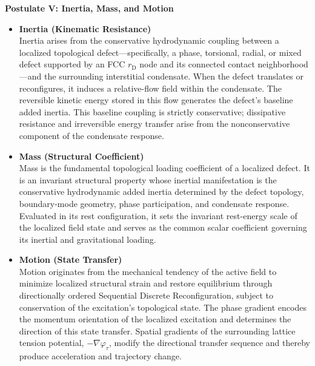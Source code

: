 \vspace{1.0em}
\begin{samepage}
\label{postulate:five}
\noindent\textbf{Postulate V: Inertia, Mass, and Motion}
\begin{itemize}

    \item \textbf{Inertia (Kinematic Resistance)}\\
    Inertia arises from the conservative hydrodynamic coupling between a localized topological defect---specifically, a phase, torsional, radial, or mixed defect supported by an FCC \(r_{\mathrm D}\) node and its connected contact neighborhood---and the surrounding interstitial condensate. When the defect translates or reconfigures, it induces a relative-flow field within the condensate. The reversible kinetic energy stored in this flow generates the defect's baseline added inertia. This baseline coupling is strictly conservative; dissipative resistance and irreversible energy transfer arise from the nonconservative component of the condensate response.

    \item \textbf{Mass (Structural Coefficient)}\\
    Mass is the fundamental topological loading coefficient of a localized defect. It is an invariant structural property whose inertial manifestation is the conservative hydrodynamic added inertia determined by the defect topology, boundary-mode geometry, phase participation, and condensate response. Evaluated in its rest configuration, it sets the invariant rest-energy scale of the localized field state and serves as the common scalar coefficient governing its inertial and gravitational loading.

    \item \textbf{Motion (State Transfer)}\\
    Motion originates from the mechanical tendency of the active field to minimize localized structural strain and restore equilibrium through directionally ordered Sequential Discrete Reconfiguration, subject to conservation of the excitation's topological state. The phase gradient encodes the momentum orientation of the localized excitation and determines the direction of this state transfer. Spatial gradients of the surrounding lattice tension potential, \(-\nabla\varphi_{\tau}\), modify the directional transfer sequence and thereby produce acceleration and trajectory change.

\end{itemize}
\end{samepage}
